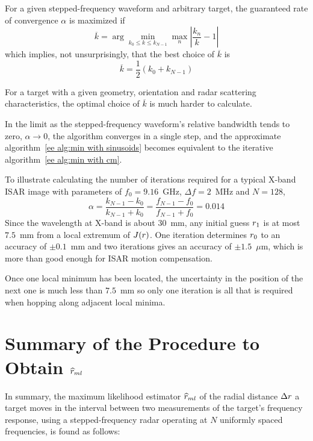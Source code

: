 For a given stepped-frequency waveform and arbitrary target, 
the guaranteed rate of convergence $\alpha$ is maximized if
\begin{equation}
\overline{k}=\arg\min_{k_0\leq k\leq k_{N-1}}
\max_n \left|\frac{k_n}{k}-1\right|
\end{equation}
which implies, not unsurprisingly, that the best choice of $\overline{k}$ is
\begin{equation}
\overline{k}=\frac{1}{2}\left(k_0+k_{N-1}\right)
\end{equation}

For a target with a given geometry, orientation and radar scattering
characteristics, the optimal choice of $\overline{k}$ is much harder to
calculate.

In the limit as the stepped-frequency waveform's relative bandwidth tends to
zero, $\alpha\rightarrow 0$, the algorithm converges in a single step, and
the approximate algorithm~\ref{ee alg:min with sinusoids} becomes equivalent to
the iterative algorithm~\ref{ee alg:min with cm}.

 
To illustrate calculating the number of iterations required for a typical 
X-band ISAR image with parameters of $f_0=9.16$~GHz, $\Delta f=2$~MHz and 
$N=128$, 
\begin{equation}
\alpha=\frac{k_{N-1}-k_0}{k_{N-1}+k_0}
=\frac{f_{N-1}-f_0}{f_{N-1}+f_0}
=0.014
\end{equation}
Since the wavelength at X-band is about $30$~mm,
any initial guess ${r}_1$ is at most $7.5$~mm from a local extremum of $J({r})$.
One iteration determines ${r}_0$ to an accuracy of $\pm0.1$~mm and two 
iterations gives an accuracy of $\pm1.5$~$\mu$m, which is more than good
enough for ISAR motion compensation.

Once one local minimum has been located, the uncertainty in the position
of the next one is much less than $7.5$~mm so only one iteration is all that
is required when hopping along adjacent local minima.

\section{Summary of the Procedure to Obtain $\widehat{r}_{ml}$}

In summary, the maximum likelihood estimator $\widehat{r}_{ml}$ of the radial
distance ${\Delta r}$ a target moves in the interval between two measurements of
the target's frequency response, using a stepped-frequency radar operating at
$N$ uniformly spaced frequencies, is found as follows:

